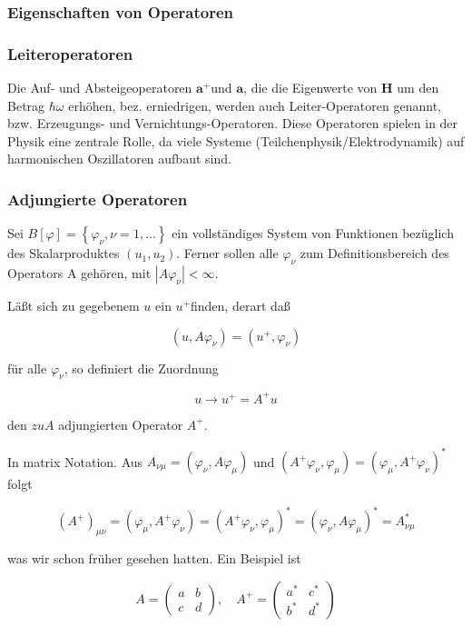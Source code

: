 \documentclass[10pt, letterpaper]{article}
\begin{document}
\subsubsection*{Eigenschaften von Operatoren}
\subsubsection*{Leiteroperatoren}
Die Auf- und Absteigeoperatoren $\mathbf{a}^{+}$und $\mathbf{a}$, die die Eigenwerte von $\mathbf{H}$ um den Betrag $\hbar \omega$ erhöhen, bez. erniedrigen, werden auch Leiter-Operatoren genannt, bzw. Erzeugungs- und Vernichtungs-Operatoren. Diese Operatoren spielen in der Physik eine zentrale Rolle, da viele Systeme (Teilchenphysik/Elektrodynamik) auf harmonischen Oszillatoren aufbaut sind.

\subsubsection*{Adjungierte Operatoren}
Sei $B[\varphi]=\left\{\varphi_{\nu}, \nu=1, \ldots\right\}$ ein vollständiges System von Funktionen bezüglich des Skalarproduktes $\left(u_{1}, u_{2}\right)$. Ferner sollen alle $\varphi_{\nu}$ zum Definitionsbereich des Operators A gehören, mit $\left|A \varphi_{\nu}\right|<\infty$.

Läßt sich zu gegebenem $u$ ein $u^{+}$finden, derart daß

$$
\left(u, A \varphi_{\nu}\right)=\left(u^{+}, \varphi_{\nu}\right)
$$

für alle $\varphi_{\nu}$, so definiert die Zuordnung

$$
u \rightarrow u^{+}=A^{+} u
$$

den $z u A$ adjungierten Operator $A^{+}$.

In matrix Notation. Aus $A_{\nu \mu}=\left(\varphi_{\nu}, A \varphi_{\mu}\right)$ und $\left(A^{+} \varphi_{\nu}, \varphi_{\mu}\right)=\left(\varphi_{\mu}, A^{+} \varphi_{\nu}\right)^{*}$ folgt

$$
\left(A^{+}\right)_{\mu \nu}=\left(\varphi_{\mu}, A^{+} \varphi_{\nu}\right)=\left(A^{+} \varphi_{\nu}, \varphi_{\mu}\right)^{*}=\left(\varphi_{\nu}, A \varphi_{\mu}\right)^{*}=A_{\nu \mu}^{*}
$$

was wir schon früher gesehen hatten. Ein Beispiel ist

$$
A=\left(\begin{array}{cc}
a & b \\
c & d
\end{array}\right), \quad A^{+}=\left(\begin{array}{cc}
a^{*} & c^{*} \\
b^{*} & d^{*}
\end{array}\right)
$$
\end{document}
